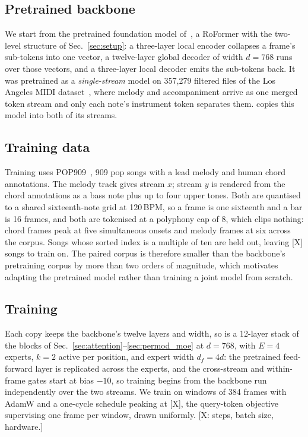 \subsection{Pretrained backbone}
\label{sec:backbone}

We start from the pretrained foundation model
of~\cite{yinyang}, a RoFormer with the two-level
structure of Sec.~\ref{sec:setup}: a three-layer local encoder collapses a frame's
sub-tokens into one vector, a twelve-layer global decoder of width
$d = 768$ runs over those vectors, and a three-layer local decoder
emits the sub-tokens back. It was pretrained as a \emph{single-stream}
model on 357{,}279 filtered files of the Los Angeles MIDI
dataset~\cite{lamd}, where melody and accompaniment arrive as one
merged token stream and only each note's instrument token separates
them. \sys copies this model into both of its streams.

\subsection{Training data}
\label{sec:data}

Training uses POP909~\cite{pop909}, 909 pop songs with a lead melody
and human chord annotations. The melody track gives stream $x$; stream
$y$ is rendered from the chord annotations as a bass note plus up to
four upper tones. Both are quantised to a shared sixteenth-note grid at
120\,BPM, so a frame is one sixteenth and a bar is 16 frames, and both
are tokenised at a polyphony cap of 8, which clips nothing: chord
frames peak at five simultaneous onsets and melody frames at six across
the corpus. Songs whose sorted index is a multiple of ten are held out,
leaving [X] songs to train on. The paired corpus is therefore
smaller than the backbone's pretraining corpus by more than two orders
of magnitude, which motivates adapting the pretrained model rather than
training a joint model from scratch.

\subsection{Training}
\label{sec:training}

Each copy keeps the backbone's twelve layers and width, so \sys is a
12-layer stack of the blocks of
Sec.~\ref{sec:attention}--\ref{sec:permod_moe} at $d = 768$, with
$E = 4$ experts, $k = 2$ active per position, and expert width
$d_f = 4d$: the pretrained feed-forward layer is replicated across the
experts, and the cross-stream and within-frame gates start at bias
$-10$, so training begins from the backbone run independently over the
two streams. We train on windows of 384 frames with AdamW and a
one-cycle schedule peaking at [X], the query-token objective
supervising one frame per window, drawn uniformly. [X: steps,
batch size, hardware.]

